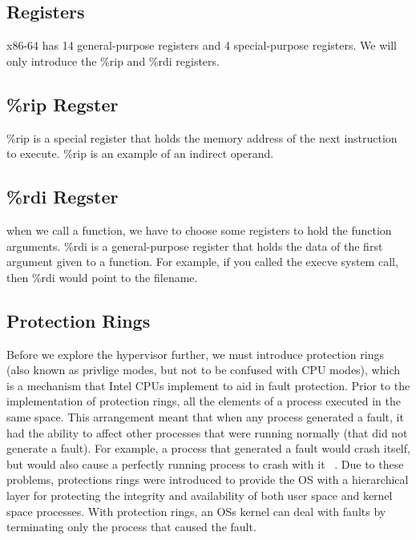 \documentclass{report}
\begin{document}
\begin{spacing}{1.5}
\subsection{Registers}

{\large
x86-64 has 14 general-purpose registers and 4 special-purpose registers. We will only introduce the \%rip and \%rdi registers.
\newline
}

\subsection{\%rip Regster}

{\large
\%rip is a special register that holds the memory address of the next instruction to execute. \%rip is an example of an indirect operand.
\newline
}


\subsection{\%rdi Regster}

{\large
when we call a function, we have to choose some registers to hold the function arguments. \%rdi is a general-purpose register that holds the data of the first argument given to a function. For example, if you called the execve system call, then \%rdi would point to the filename.
\newline
}




\subsection{Protection Rings}

{\large
Before we explore the hypervisor further, we must introduce protection rings (also known as privlige modes, but not to be confused with CPU modes), which is a mechanism that Intel CPUs implement to aid in fault protection. Prior to the implementation of protection rings, all the elements of a process executed in the same space. This arrangement meant that when any process generated a fault, it had the ability to affect other processes that were running normally (that did not generate a fault). For example, a process that generated a fault would crash itself, but would also cause a perfectly running process to crash with it ~\cite{Wiley2011}. Due to these problems, protections rings were introduced to provide the OS with a hierarchical layer for protecting the integrity and availability of both user space and kernel space processes. With protection rings, an OSs kernel can deal with faults by terminating only the process that caused the fault. 
\newline
}


\end{spacing}
\end{document}

